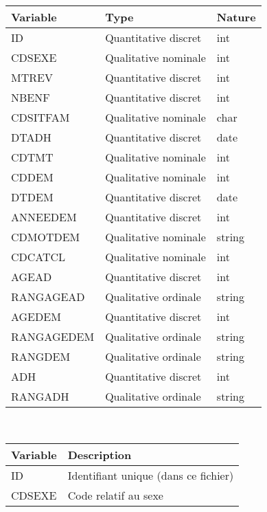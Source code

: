 \documentclass{ceri/sty/rapport}
\begin{document}
\begin{table}[htb!]
	\begin{tabular}{l l l}
		\hline
		\rowcolor{fgLightRed} 
		\textbf{Variable} & \textbf{Type} & \textbf{Nature}	\\ 
		\hline
             ID & Quantitative discret & int \\
             CDSEXE & Qualitative nominale & int \\
             MTREV & Quantitative discret & int \\
             NBENF & Quantitative discret & int \\
             CDSITFAM & Qualitative nominale & char \\
             DTADH & Quantitative discret & date \\
             CDTMT & Qualitative nominale & int \\
             CDDEM & Qualitative nominale & int \\
             DTDEM & Quantitative discret & date \\
             ANNEEDEM & Quantitative discret & int \\
             CDMOTDEM & Qualitative nominale & string \\
             CDCATCL & Qualitative nominale & int \\
             AGEAD & Quantitative discret & int \\
             RANGAGEAD & Qualitative ordinale & string \\
             AGEDEM & Quantitative discret & int \\
             RANGAGEDEM & Qualitative ordinale & string \\
             RANGDEM & Qualitative ordinale & string \\
             ADH & Quantitative discret & int \\
             RANGADH & Qualitative ordinale & string \\
		\hline
	\end{tabular} \\
        \begin{tabular}{l l}
		\hline
		\rowcolor{fgLightRed} 
		\textbf{Variable} & \textbf{Description} \\ 
		\hline
             ID & Identifiant unique (dans ce fichier) \\
             CDSEXE & Code relatif au sexe \\

\end{tabular}
\end{table}
\end{document}
